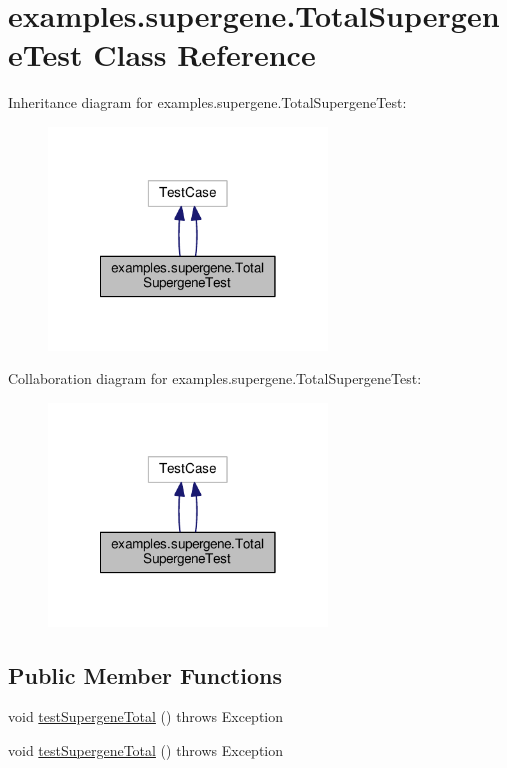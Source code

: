 \hypertarget{classexamples_1_1supergene_1_1_total_supergene_test}{\section{examples.\-supergene.\-Total\-Supergene\-Test Class Reference}
\label{classexamples_1_1supergene_1_1_total_supergene_test}
}


Inheritance diagram for examples.\-supergene.\-Total\-Supergene\-Test\-:
\nopagebreak
\begin{figure}[H]
\begin{center}
\leavevmode
\includegraphics[width=210pt]{classexamples_1_1supergene_1_1_total_supergene_test__inherit__graph}
\end{center}
\end{figure}


Collaboration diagram for examples.\-supergene.\-Total\-Supergene\-Test\-:
\nopagebreak
\begin{figure}[H]
\begin{center}
\leavevmode
\includegraphics[width=210pt]{classexamples_1_1supergene_1_1_total_supergene_test__coll__graph}
\end{center}
\end{figure}
\subsection*{Public Member Functions}
\begin{DoxyCompactItemize}
\item 
void \hyperlink{classexamples_1_1supergene_1_1_total_supergene_test_a2246c01a84642926fccccb17d431e2f3}{test\-Supergene\-Total} ()  throws Exception 
\item 
void \hyperlink{classexamples_1_1supergene_1_1_total_supergene_test_a2246c01a84642926fccccb17d431e2f3}{test\-Supergene\-Total} ()  throws Exception 
\end{DoxyCompactItemize}
